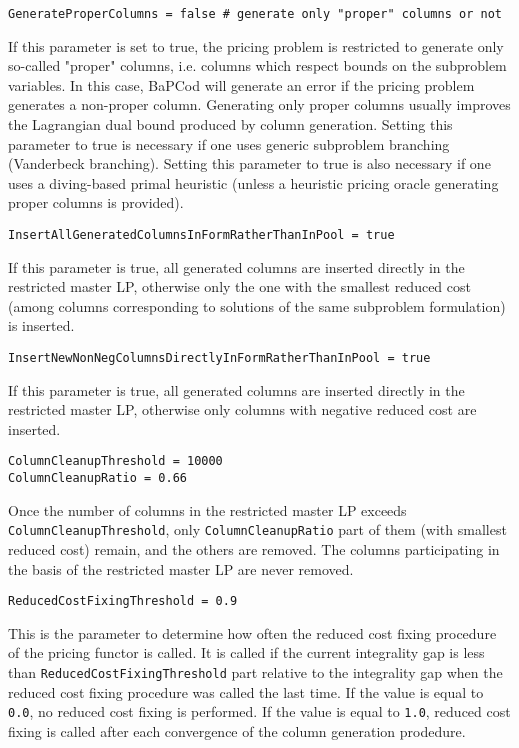 \documentclass[10pt,a4paper]{article}
\newcommand{\bc}{BaPCod\xspace}
\begin{document}
\begin{lstlisting}
GenerateProperColumns = false # generate only "proper" columns or not
\end{lstlisting}
If this parameter is set to true, the pricing problem is restricted to generate only so-called "proper" columns,
i.e. columns which respect bounds on the subproblem variables. In this case, \bc will generate an error if the pricing
problem generates a non-proper column. Generating only proper columns usually improves the Lagrangian dual bound
produced by column generation. Setting this parameter to true is necessary if one uses generic subproblem branching
(Vanderbeck branching). Setting this parameter to true is also necessary if one uses a diving-based primal heuristic
(unless a heuristic pricing oracle generating proper columns is provided).

\begin{lstlisting}
InsertAllGeneratedColumnsInFormRatherThanInPool = true
\end{lstlisting}
If this parameter is true, all generated columns are inserted directly in the restricted master LP, otherwise only the
one with the smallest reduced cost (among columns corresponding to solutions of the same subproblem formulation) is
inserted.

\begin{lstlisting}
InsertNewNonNegColumnsDirectlyInFormRatherThanInPool = true
\end{lstlisting}
If this parameter is true, all generated columns are inserted directly in the restricted master LP, otherwise only
columns with negative reduced cost are inserted. 

\begin{lstlisting}
ColumnCleanupThreshold = 10000
ColumnCleanupRatio = 0.66
\end{lstlisting}
Once the number of columns in the restricted master LP exceeds\\ \verb+ColumnCleanupThreshold+, only
\verb+ColumnCleanupRatio+ part of them (with smallest reduced cost) remain, and the others are removed. The columns
participating in the basis of the restricted master LP are never removed.

\begin{lstlisting}
ReducedCostFixingThreshold = 0.9
\end{lstlisting}
This is the parameter to determine how often the reduced cost fixing procedure of the pricing functor is called.
It is called if the current integrality gap is less than \verb+ReducedCostFixingThreshold+ part relative to the
integrality gap when the reduced cost fixing procedure was called the last time. If the value is equal to \verb+0.0+, no
reduced cost fixing is performed. If the value is equal to \verb+1.0+, reduced cost fixing is called after each
convergence of the column generation prodedure. 
\end{document}

